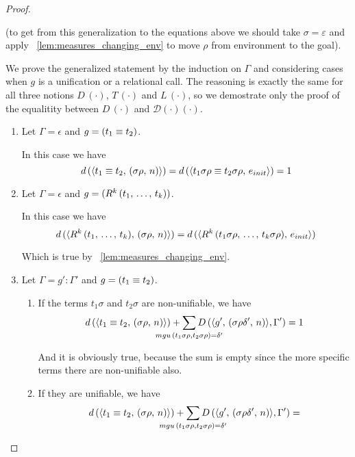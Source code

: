 \begin{proof}
\begin{enumerate}
(to get from this generalization to the equations above we should take $\sigma = \varepsilon$ and apply \lemmaword~\ref{lem:measures_changing_env} to move $\rho$ from environment to the goal).

We prove the generalized statement by the induction on $\Gamma$ and considering cases when $g$ is a unification or a relational call. The reasoning is exactly the same for all three notions $D\,(\cdot)$, $T\,(\cdot)$ and $L\,(\cdot)$, so we demostrate only the proof of the equalitity between $D\,(\cdot)$ and $\mathcal{D}(\cdot)(\cdot)$.

	\begin{enumerate}

	\item Let $\Gamma = \epsilon$ and $g = (t_1 \equiv t_2)$.
	
	In this case we have \[ d\,(\langle t_1 \equiv t_2 ,\, (\sigma \rho ,\, n) \rangle) = d\,(\langle t_1 \sigma \rho \equiv t_2 \sigma \rho ,\, e_{init} \rangle) = 1 \]
	
	\item Let $\Gamma = \epsilon$ and $g = (R^k\,(t_1, \, \dots, \, t_k))$.
	
	In this case we have \[ d\,(\langle R^k\,(t_1, \, \dots, \, t_k) ,\, (\sigma \rho ,\, n) \rangle) = d\,(\langle R^k\,(t_1 \sigma \rho, \, \dots, \, t_k \sigma \rho) ,\, e_{init} \rangle) \]
	
	Which is true by \lemmaword~\ref{lem:measures_changing_env}.
	
	\item Let $\Gamma = g' : \Gamma'$ and $g = (t_1 \equiv t_2)$.
	
	\begin{enumerate}
	
	    \item If the terms $t_1 \sigma$ and $t_2 \sigma$ are non-unifiable, we have \[ d\,(\taskst{\unigoal{t_1}{t_2}}{\mkenv{\sigma \rho}{n}}) + \smashoperator{\sum\limits_{mgu\,(t_1 \sigma \rho, t_2 \sigma \rho) = \delta'}} D\,(\taskst{g'}{\mkenv{\sigma \rho \delta'}{n}}, \Gamma') = 1 \]
	    
	    And it is obviously true, because the sum is empty since the more specific terms there are non-unifiable also.
	
	    \item If they are unifiable, we have \[ d\,(\taskst{\unigoal{t_1}{t_2}}{\mkenv{\sigma \rho}{n}}) + \smashoperator{\sum\limits_{mgu\,(t_1 \sigma \rho, t_2 \sigma \rho) = \delta'}} D\,(\taskst{g'}{\mkenv{\sigma \rho \delta'}{n}}, \Gamma') = \]
	

\end{enumerate}
\end{enumerate}
\end{enumerate}
\end{proof}
